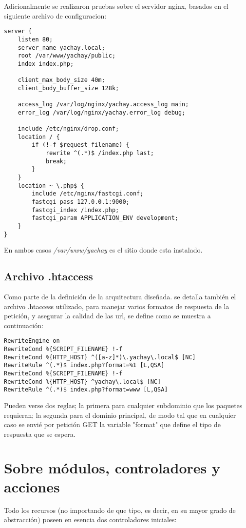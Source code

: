 Adicionalmente se realizaron pruebas sobre el servidor nginx, basados en el siguiente archivo de configuracion:

\small
\begin{verbatim}
server {
    listen 80;
    server_name yachay.local;
    root /var/www/yachay/public;
    index index.php;

    client_max_body_size 40m;
    client_body_buffer_size 128k;

    access_log /var/log/nginx/yachay.access_log main;
    error_log /var/log/nginx/yachay.error_log debug;

    include /etc/nginx/drop.conf;
    location / {
        if (!-f $request_filename) {
            rewrite ^(.*)$ /index.php last;
            break;
        }
    }
    location ~ \.php$ {
        include /etc/nginx/fastcgi.conf;
        fastcgi_pass 127.0.0.1:9000;
        fastcgi_index /index.php;
        fastcgi_param APPLICATION_ENV development;
    }
}
\end{verbatim}

En ambos casos \emph{/var/www/yachay} es el sitio donde esta instalado.

\subsection{Archivo .htaccess}
Como parte de la definición de la arquitectura diseñada. se detalla también el archivo .htaccess utilizado, para manejar varios formatos de respuesta de la petición, y asegurar la calidad de las url, se define como se muestra a continuación:

\begin{verbatim}
RewriteEngine on
RewriteCond %{SCRIPT_FILENAME} !-f
RewriteCond %{HTTP_HOST} ^([a-z]*)\.yachay\.local$ [NC]
RewriteRule ^(.*)$ index.php?format=%1 [L,QSA]
RewriteCond %{SCRIPT_FILENAME} !-f
RewriteCond %{HTTP_HOST} ^yachay\.local$ [NC]
RewriteRule ^(.*)$ index.php?format=www [L,QSA]
\end{verbatim}

Pueden verse dos reglas; la primera para cualquier subdominio que los paquetes requieran; la segunda para el dominio principal, de modo tal que en cualquier caso se envié por petición GET la variable "format" que define el tipo de respuesta que se espera.

\section{Sobre módulos, controladores y acciones}
Todo los recursos (no importando de que tipo, es decir, en su mayor grado de abstracción) poseen en esencia dos controladores iniciales:

